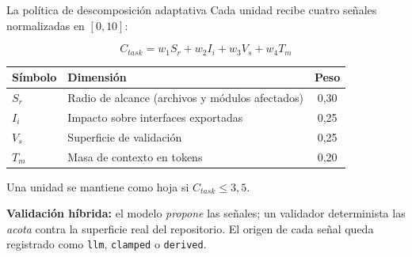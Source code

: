 \documentclass[10pt,aspectratio=169]{beamer}
\begin{document}
\begin{frame}{La política de descomposición adaptativa}
  Cada unidad recibe cuatro señales normalizadas en $[0,10]$:

  \[
    C_{\mathit{task}} = w_1 S_r + w_2 I_i + w_3 V_s + w_4 T_m
  \]

  \begin{center}
  \small
  \begin{tabular}{llc}
    \toprule
    Símbolo & Dimensión & Peso \\
    \midrule
    $S_r$ & Radio de alcance (archivos y módulos afectados) & 0{,}30 \\
    $I_i$ & Impacto sobre interfaces exportadas & 0{,}25 \\
    $V_s$ & Superficie de validación & 0{,}25 \\
    $T_m$ & Masa de contexto en tokens & 0{,}20 \\
    \bottomrule
  \end{tabular}
  \end{center}

  \bigskip
  Una unidad se mantiene como hoja si $C_{\mathit{task}} \le 3{,}5$.

  \bigskip
  \pause
  \textbf{Validación híbrida:} el modelo \emph{propone} las señales; un
  validador determinista las \emph{acota} contra la superficie real del
  repositorio. El origen de cada señal queda registrado como \texttt{llm},
  \texttt{clamped} o \texttt{derived}.
\end{frame}
\end{document}

